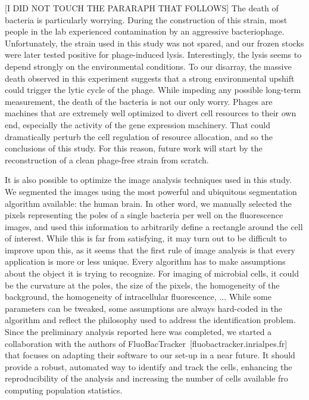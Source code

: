 [I DID NOT TOUCH THE PARARAPH THAT FOLLOWS]
The death of bacteria is particularly worrying.
During the construction of this strain, most people in the lab experienced contamination by an aggressive bacteriophage.
Unfortunately, the strain used in this study was not spared, and our frozen stocks were later tested positive for phage-induced lysis.
Interestingly, the lysis seems to depend strongly on the environmental conditions.
To our disarray, the massive death observed in this experiment suggests that a strong environmental upshift could trigger the lytic cycle of the phage.
While impeding any possible long-term measurement, the death of the bacteria is not our only worry.
Phages are machines that are extremely well optimized to divert cell resources to their own end, especially the activity of the gene expression machinery.
That could dramatically perturb the cell regulation of resource allocation, and so the conclusions of this study.
For this reason, future work will start by the reconstruction of a clean phage-free strain from scratch.

It is also possible to optimize the image analysis techniques used in this study.
We segmented the images using the most powerful and ubiquitous segmentation algorithm available: the human brain.
In other word, we manually selected the pixels representing the poles of a single bacteria per well on the fluorescence images, and used this information to arbitrarily define a rectangle around the cell of interest.
While this is far from satisfying, it may turn out to be difficult to improve upon this, as it seems that the first rule of image analysis is that every application is more or less unique.
Every algorithm has to make assumptions about the object it is trying to recognize.
For imaging of microbial cells, it could be the curvature at the poles, the size of the pixels, the homogeneity of the background, the homogeneity of intracellular fluorescence, ...
While some parameters can be tweaked, some assumptions are always hard-coded in the algorithm and reflect the philosophy used to address the identification problem.
Since the preliminary analysis reported here was completed, we started a collaboration with the authors of FluoBacTracker~[fluobactracker.inrialpes.fr] that focuses on adapting their software to our set-up in a near future.
It should provide a robust, automated way to identify and track the cells, enhancing the reproducibility of the analysis and increasing the number of cells available fro computing population statistics.


